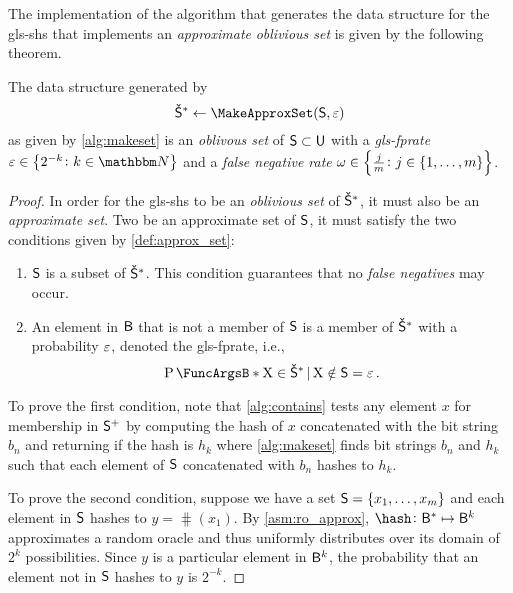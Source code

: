 \documentclass[ ../main.tex]{subfiles}
\begin{document}
The implementation of the algorithm that generates the data structure for the \gls{gls-shs} that implements an \emph{approximate} \emph{oblivious set} is given by the following theorem.
\begin{theorem}
The data structure generated by
\begin{equation}
    \OASet{S} \gets \MakeApproxSet(\Set{S},\fprate)
\end{equation}
as given by \cref{alg:makeset} is an \emph{oblivous set} of $\Set{S} \subset \Set{U}$ with a \emph{\gls{gls-fprate}} $\fprate \in \left\{2^{-k} \colon k \in \NatSet\right\}$ and a \emph{false negative rate} $\omega \in \left\{\frac{j}{m} \colon j \in \{1,\ldots,m\}\right\}$.
\end{theorem}
\begin{proof}
In order for the \gls{gls-shs} to be an \emph{oblivious set} of $\OASet{S}$, it must also be an \emph{approximate set}. Two be an approximate set of $\Set{S}$, it must satisfy the two conditions given by \cref{def:approx_set}:
\begin{enumerate}
    \item $\Set{S}$ is a subset of $\OASet{S}$. This condition guarantees that no \emph{false negatives} may occur.
    \item An element in $\Set{B}$ that is not a member of $\Set{S}$ is a member of $\OASet{S}$ with a probability $\varepsilon$, denoted the \gls{gls-fprate}, i.e.,
    \begin{equation}
        \Prob{\RV{X} \in \OASet{S} \given \RV{X} \notin \Set{S}} = \fprate\,.
    \end{equation}
\end{enumerate}

To prove the first condition, note that \cref{alg:contains} tests any element $x$ for membership in $\PASet{S}$ by computing the hash of $x$ concatenated with the bit string $b_n$ and returning \True if the hash is $h_k$ where \cref{alg:makeset} finds bit strings $b_n$ and $h_k$ such that each element of $\Set{S}$ concatenated with $b_n$ hashes to $h_k$.

To prove the second condition, suppose we have a set $\Set{S} = \{x_1,\ldots,x_m\}$ and each element in $\Set{S}$ hashes to $y = \hash(x_1)$. By \cref{asm:ro_approx}, $\hash \colon \Set{B}^* \mapsto \Set{B}^k$ approximates a random oracle and thus uniformly distributes over its domain of $2^k$ possibilities. Since $y$ is a particular element in $\Set{B}^k$, the probability that an element not in $\Set{S}$ hashes to $y$ is $2^{-k}$.
\end{proof}
\end{document}
